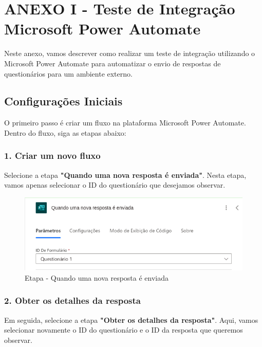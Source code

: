 \chapter*{ANEXO I - Teste de Integração Microsoft Power Automate}
\label{anexoITIMPA}

Neste anexo, vamos descrever como realizar um teste de integração utilizando o Microsoft Power Automate para automatizar o envio de respostas de questionários para um ambiente externo.

\section*{Configurações Iniciais}

O primeiro passo é criar um fluxo na plataforma Microsoft Power Automate. Dentro do fluxo, siga as etapas abaixo:

\subsection*{1. Criar um novo fluxo}

Selecione a etapa \textbf{"Quando uma nova resposta é enviada"}.
Nesta etapa, vamos apenas selecionar o ID do questionário que desejamos observar.

\begin{figure}[H]
    \centering
    \includegraphics[width=1\textwidth]{figuras/mpa_new_answer.png}
    \caption{Etapa - Quando uma nova resposta é enviada}
    \label{fig:report_questions}
\end{figure}

\subsection*{2. Obter os detalhes da resposta}

Em seguida, selecione a etapa \textbf{"Obter os detalhes da resposta"}.
Aqui, vamos selecionar novamente o ID do questionário e o ID da resposta que queremos observar.

